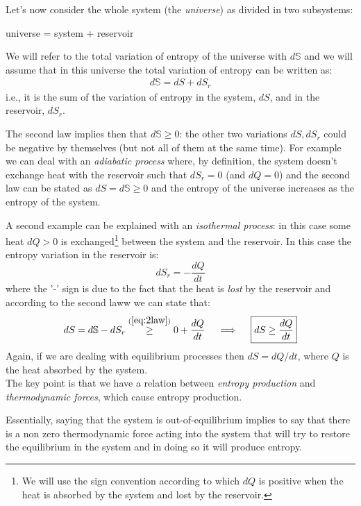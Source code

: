 \documentclass[\main/main.tex]{subfiles}
\begin{document}
Let's now consider the whole system (the \textit{universe}) as divided in two subsystems: 
\begin{center}
    universe = system + reservoir
\end{center}

We will refer to the total variation of entropy of the universe with $d\mathbb{S}$ and we will assume that in this
universe the total variation of entropy can be written as:
\begin{align}
    d \mathbb{S}=d S+d S_{r}
\end{align}
i.e., it is the sum of the variation of entropy in the system, $dS$, and in the reservoir, $dS_r$.

The second law implies then that $d\mathbb{S}\geq 0$: the other two variations $dS,dS_r$ could be negative by themselves (but not all of them at the same time). For example we can deal with an \textit{adiabatic process} where, by definition, the system doesn't exchange heat with the reservoir such that $dS_r=0$ (and $dQ=0$) and the second law can be stated as $dS=d\mathbb{S}\geq 0$ and the entropy of the universe increases as the entropy of the system.

A second example can be explained with an \textit{isothermal process}: in this case some heat $dQ>0$ is exchanged\footnote{We will use the sign convention according to which $dQ$ is positive when the heat is absorbed by the system and lost by the reservoir.} between the system and the reservoir. In this case the entropy variation in the reservoir is:
\begin{equation}
    dS_r=-\frac{dQ}{dt}
    \label{eq:2law}
\end{equation}
where the '-' sign is due to the fact that the heat is \textit{lost} by the reservoir and according to the second laww we can state that:
\begin{equation}
    dS=d\mathbb{S}-dS_r\overset{(\ref{eq:2law})}{\geq} 0 + \frac{dQ}{dt} \quad \implies \quad \boxed{dS \geq \frac{dQ}{dt}}
\end{equation}
Again, if we are dealing with equilibrium processes then $dS=dQ/dt$, where $Q$ is the heat absorbed by the system. \\

The key point is that we have a relation between \textit{entropy production} and \textit{thermodynamic forces}, which cause entropy production.

Essentially, saying that the system is out-of-equilibrium implies to say that there is a non zero thermodynamic force acting into the system that will try to restore the equilibrium in the system and in doing so it will produce entropy.
\end{document}
